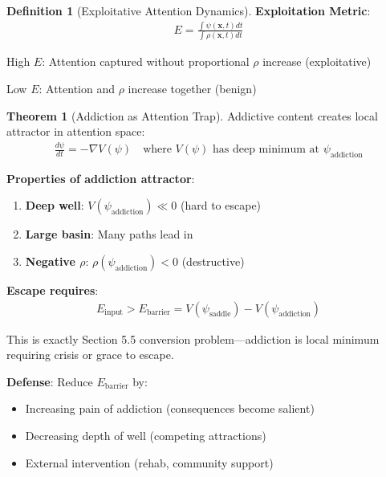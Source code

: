 \documentclass[11pt,a4paper]{article}
\theoremstyle{definition}
\newtheorem{definition}{Definition}[section]
\newtheorem{theorem}{Theorem}[section]
\theoremstyle{remark}
\begin{document}
\begin{small}
\begin{enumerate}
\begin{definition}[Exploitative Attention Dynamics]
\textbf{Exploitation Metric}:
\begin{align}
E = \frac{\int \psi(\mathbf{x}, t) dt}{\int \rho(\mathbf{x}, t) dt}
\end{align}

High \(E\): Attention captured without proportional \(\rho\) increase (exploitative)

Low \(E\): Attention and \(\rho\) increase together (benign)
\end{definition}

\begin{theorem}[Addiction as Attention Trap]
Addictive content creates local attractor in attention space:
\begin{align}
\frac{d\psi}{dt} = -\nabla V(\psi) \quad \text{where } V(\psi) \text{ has deep minimum at } \psi_{\text{addiction}}
\end{align}

\textbf{Properties of addiction attractor}:
\begin{enumerate}
    \item \textbf{Deep well}: \(V(\psi_{\text{addiction}}) \ll 0\) (hard to escape)
    \item \textbf{Large basin}: Many paths lead in
    \item \textbf{Negative \(\rho\)}: \(\rho(\psi_{\text{addiction}}) < 0\) (destructive)
\end{enumerate}

\textbf{Escape requires}:
\begin{align}
E_{\text{input}} > E_{\text{barrier}} = V(\psi_{\text{saddle}}) - V(\psi_{\text{addiction}})
\end{align}

This is exactly Section 5.5 conversion problem—addiction is local minimum requiring crisis or grace to escape.

\textbf{Defense}: Reduce \(E_{\text{barrier}}\) by:
\begin{itemize}
    \item Increasing pain of addiction (consequences become salient)
    \item Decreasing depth of well (competing attractions)
    \item External intervention (rehab, community support)
\end{itemize}
\end{theorem}

\begin{figure}[H]
\centering
{}
\end{figure}
\end{enumerate}
\end{small}
\end{document}
